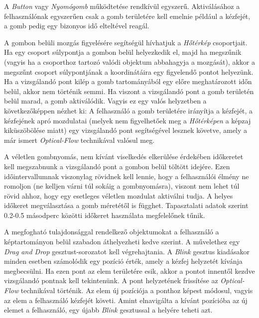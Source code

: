 


A \textit{Button} vagy \textit{Nyomógomb} működtetése rendkívül egyszerű. Aktiválásához a felhasználónak egyszerűen csak a gomb területére kell emelnie például a kézfejét, a gomb pedig egy bizonyos idő elteltével reagál.

A gombon belüli mozgás figyelésére segítségül hívhatjuk a \textit{Hőtérkép} csoportjait. Ha egy csoport súlypontja a gombon belül helyezkedik el, majd ha megszűnik (vagyis ha a csoporthoz tartozó valódi objektum abbahagyja a mozgását), akkor a megszűnt csoport súlypontjának a koordinátáira egy figyelendő pontot helyezünk. Ha a vizsgálandó pont kilép a gomb tartományából egy előre meghatározott időn belül, akkor nem történik semmi. Ha viszont a vizsgálandó pont a gomb területén belül marad, a gomb aktiválódik. 
Vagyis ez egy valós helyzetben a következőképpen nézhet ki: A felhasználó a gomb területére irányítja a kézfejét, a kézfejének apró mozdulatai (melyek nem figyelhetőek meg a \textit{Hőtérképen} a képzaj kiküszöbölése miatt) egy vizsgálandó pont segítségével lesznek követve, amely a már ismert \textit{Optical-Flow} technikával valósul meg.

A véletlen gombnyomás, nem kívánt viselkedés elkerülése érdekében időkeretet kell megszabnunk a vizsgálandó pont a gombon belül töltött idejére. Ezen időintervallumnak viszonylag rövidnek kell lennie, hogy a felhasználói élmény ne romoljon (ne kelljen várni túl sokáig a gombnyomásra), viszont nem lehet túl rövid ahhoz, hogy egy esetleges véletlen mozdulat aktiválni tudja. A helyes időkeret megválasztása a gomb méretétől is függhet. Tapasztalati adatok szerint 0.2-0.5 másodperc közötti időkeret használata megfelelőnek tűnik.


A megfogható tulajdonsággal rendelkező objektumokat a felhasználó a képtartományon belül szabadon áthelyezheti kedve szerint. A művelethez egy \textit{Drag and Drop} gesztust-sorozatot kell végrehajtania. A \textit{Blink} gesztus kiadásakor minden esetben számolódik egy pozíció érték, amely a kézfej helyzetét kívánja megbecsülni. Ha ezen pont az elem területére esik, akkor a pontot innentől kezdve vizsgálandó pontnak kell tekintenünk. A pont helyzetének frissítése az \textit{Optical-Flow} technikával történik. Az elem új pozíciója a ponthoz képest módosul, vagyis az elem a felhasználó kézfejét követi.
Amint elnavigálta a kívánt pozícióba az új elemet a felhasználó, egy újabb \textit{Blink} gesztussal a helyére teheti azt.

